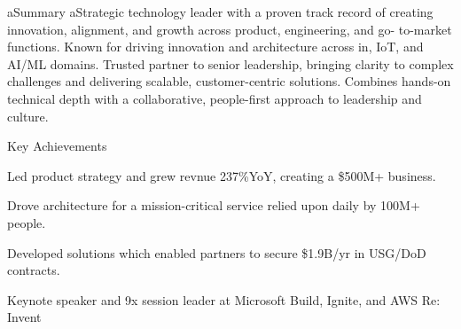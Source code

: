 \documentclass{resume} %
\begin{document}
\vspace{-1em}
\begin{rSummary}{aSummary}
  aStrategic technology leader with a proven track record of creating innovation, alignment, and growth across product, engineering, and go- to-market functions. Known for driving innovation and architecture across in, IoT, and AI/ML domains. Trusted partner to senior leadership, bringing clarity to complex challenges and delivering scalable, customer-centric solutions. Combines hands-on technical depth with a collaborative, people-first approach to leadership and culture.
\end{rSummary}
\begin{minipage}[t]{0.4\textwidth}
  \begin{rSection}{Key Achievements}
    \begin{rSkills}{}
      \item Led product strategy and grew revnue 237\%YoY, creating a \$500M+ business.
      \item Drove architecture for a mission-critical service relied upon daily by 100M+ people.
      \item Developed solutions which enabled partners to secure \$1.9B/yr in USG/DoD contracts.
      \item Keynote speaker and 9x session leader at Microsoft Build, Ignite, and AWS Re: Invent
    \end{rSkills}
  \end{rSection}
\end{minipage}

\end{document}
